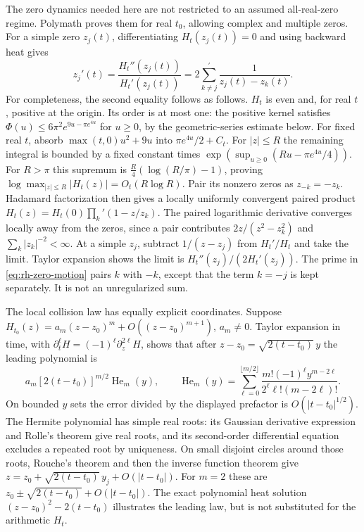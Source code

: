 The zero dynamics needed here are not restricted to an assumed
all-real-zero regime. Polymath \cite[\S3, Proposition~3.1]{polymath2019}
proves them for real $t_0$, allowing complex and multiple zeros.
For a simple zero $z_j(t)$, differentiating $H_t(z_j(t))=0$ and using
backward heat gives
\begin{equation}
 z_j'(t)=\frac{H_t''(z_j(t))}{H_t'(z_j(t))}
 =2\sum_{k\ne j}^{\prime}\frac1{z_j(t)-z_k(t)}.
 \label{eq:rh-zero-motion}
\end{equation}
For completeness, the second equality follows as follows.
$H_t$ is even and, for real $t$, positive at the origin.
Its order is at most one: the positive kernel satisfies
$\Phi(u)\le6\pi^2e^{9u-\pi e^{4u}}$ for $u\ge0$, by the
geometric-series estimate below. For fixed real $t$, absorb
$\max(t,0)u^2+9u$ into $\pi e^{4u}/2+C_t$.
For $|z|\le R$ the remaining integral is bounded by a fixed
constant times $\exp(\sup_{u\ge0}(Ru-\pi e^{4u}/4))$.
For $R>\pi$ this supremum is
$\frac R4(\log(R/\pi)-1)$, proving
$\log\max_{|z|\le R}|H_t(z)|=O_t(R\log R)$.
Pair its nonzero zeros as $z_{-k}=-z_k$. Hadamard factorization
then gives a locally uniformly convergent paired product
$H_t(z)=H_t(0)\prod_k'(1-z/z_k)$.
The paired logarithmic derivative converges locally away from the
zeros, since a pair contributes $2z/(z^2-z_k^2)$ and
$\sum_k|z_k|^{-2}<\infty$. At a simple $z_j$, subtract
$1/(z-z_j)$ from $H_t'/H_t$ and take the limit.
Taylor expansion shows the limit is $H_t''(z_j)/(2H_t'(z_j))$.
The prime in \eqref{eq:rh-zero-motion} pairs $k$ with $-k$, except
that the term $k=-j$ is kept separately. It is not an unregularized sum.

The local collision law has equally explicit coordinates. Suppose
$H_{t_0}(z)=a_m(z-z_0)^m+O((z-z_0)^{m+1})$, $a_m\ne0$.
Taylor expansion in time, with
$\partial_t^\ell H=(-1)^\ell\partial_z^{2\ell}H$, shows that after
$z-z_0=\sqrt{2(t-t_0)}\,y$ the leading polynomial is
\[
 a_m[2(t-t_0)]^{m/2}\operatorname{He}_m(y),\qquad
 \operatorname{He}_m(y)=
 \sum_{\ell=0}^{\lfloor m/2\rfloor}
 \frac{m!(-1)^\ell y^{m-2\ell}}{2^\ell\ell!(m-2\ell)!}.
\]
On bounded $y$ sets the error divided by the displayed prefactor is
$O(|t-t_0|^{1/2})$. The Hermite polynomial has simple real roots:
its Gaussian derivative expression and Rolle's theorem give real
roots, and its second-order differential equation excludes a repeated
root by uniqueness. On small disjoint circles around those roots,
Rouche's theorem and then the inverse function theorem give
$z=z_0+\sqrt{2(t-t_0)}\,y_j+O(|t-t_0|)$.
For $m=2$ these are $z_0\pm\sqrt{2(t-t_0)}+O(|t-t_0|)$.
The exact polynomial heat solution
$(z-z_0)^2-2(t-t_0)$ illustrates the leading law, but is not substituted
for the arithmetic $H_t$.

